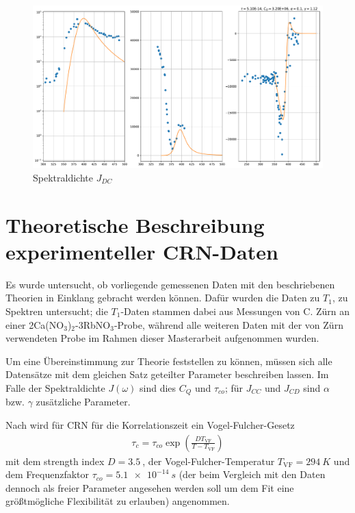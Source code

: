 \begin{figure}
	\begin{center}
		\includegraphics[width=\textwidth]{graphics/plots/THEO/J_dc_01.pdf}
	\end{center}
	\caption{Spektraldichte $J_{DC}$} \label{fig:res:theorie_j_dc}
\end{figure}









\section{Theoretische Beschreibung experimenteller CRN-Daten} \label{section:theo:daten}


Es wurde untersucht, ob vorliegende gemessenen Daten mit den beschriebenen Theorien in Einklang gebracht werden können. Dafür wurden die Daten zu $T_1$, zu Spektren untersucht; die $T_1$-Daten stammen dabei aus Messungen von C. Zürn \cite{zuern_paper} an einer 2Ca(NO$_3$)$_2$-3RbNO$_3$-Probe, während alle weiteren Daten mit der von Zürn verwendeten Probe im Rahmen dieser Masterarbeit aufgenommen wurden.

Um eine Übereinstimmung zur Theorie feststellen zu können, müssen sich alle Datensätze mit dem gleichen Satz geteilter Parameter beschreiben lassen. Im Falle der Spektraldichte $J(\omega)$ sind dies $C_Q$ und $\tau_{co}$; für $J_{CC}$ und $J_{CD}$ sind $\alpha$ bzw. $\gamma$ zusätzliche Parameter.

Nach \cite{PIMENOV199793} wird für CRN für die Korrelationszeit ein Vogel-Fulcher-Gesetz
\begin{align}
	\tau_c = \tau_{co} \exp \left( \frac{D T_\text{VF}}{T-T_\text{VF}} \right) 
\end{align}
mit dem strength index $D = \SI{3.5}{}$, der Vogel-Fulcher-Temperatur $T_\text{VF} = \SI{294}{K}$ und dem Frequenzfaktor $\tau_{co} = \SI{5.1e-14}{s}$ (der beim Vergleich mit den Daten dennoch als freier Parameter angesehen werden soll um dem Fit eine größtmögliche Flexibilität zu erlauben) angenommen.

